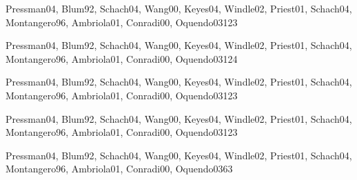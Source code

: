 \begin{syllabus}
\begin{unit}{\SEToolsAndEnvironmentsDef}{Pressman04, Blum92, Schach04, Wang00, Keyes04, Windle02, Priest01, Schach04, Montangero96, Ambriola01, Conradi00, Oquendo03}{12}{3}
   \SEToolsAndEnvironmentsAllTopics
   \SEToolsAndEnvironmentsAllObjectives
\end{unit}

\begin{unit}{\SESoftwareValidationDef}{Pressman04, Blum92, Schach04, Wang00, Keyes04, Windle02, Priest01, Schach04, Montangero96, Ambriola01, Conradi00, Oquendo03}{12}{4}
   \SESoftwareValidationAllTopics
   \SESoftwareValidationAllObjectives
\end{unit}

\begin{unit}{\SESoftwareEvolutionDef}{Pressman04, Blum92, Schach04, Wang00, Keyes04, Windle02, Priest01, Schach04, Montangero96, Ambriola01, Conradi00, Oquendo03}{12}{3}
   \SESoftwareEvolutionAllTopics
   \SESoftwareEvolutionAllObjectives
\end{unit}

\begin{unit}{\SESoftwareProjectManagementDef}{Pressman04, Blum92, Schach04, Wang00, Keyes04, Windle02, Priest01, Schach04, Montangero96, Ambriola01, Conradi00, Oquendo03}{12}{3}
    \SESoftwareProjectManagementAllTopics
    \SESoftwareProjectManagementAllObjectives
\end{unit}

\begin{unit}{\SERiskAssessmentDef}{Pressman04, Blum92, Schach04, Wang00, Keyes04, Windle02, Priest01, Schach04, Montangero96, Ambriola01, Conradi00, Oquendo03}{6}{3}
    \SERiskAssessmentAllTopics
    \SERiskAssessmentAllObjectives
\end{unit}



\begin{coursebibliography}
\end{coursebibliography}

\end{syllabus}
